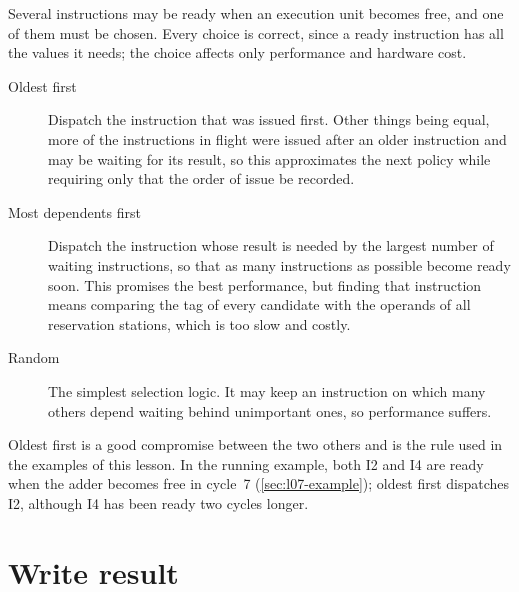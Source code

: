 \documentclass[../main.tex]{subfiles}
\begin{document}
Several instructions may be ready when an execution unit becomes free, and
one of them must be chosen.  Every choice is
correct, since a ready instruction has all the values it needs; the choice
affects only performance and hardware cost.
\begin{description}
  \item[Oldest first] Dispatch the instruction that was
    issued first.  Other things being equal, more of the instructions in
    flight were issued after an older instruction and may be waiting for its
    result, so this approximates the next policy while requiring only that
    the order of issue be recorded.
  \item[Most dependents first] Dispatch the instruction whose result is
    needed by the largest number of waiting instructions, so that as many
    instructions as possible become ready soon.  This promises the best performance, but
    finding that instruction means comparing the tag of every candidate with
    the operands of all reservation stations, which is too slow and costly.
  \item[Random] The simplest selection logic.  It may keep an instruction on
    which many others depend waiting behind unimportant ones, so performance
    suffers.
\end{description}
Oldest first is a good compromise between the two others and is the rule used
in the examples of this lesson.  In the running example, both I2 and I4 are ready when the adder becomes free in cycle~7
(\cref{sec:l07-example}); oldest first dispatches I2, although I4 has been
ready two cycles longer.

\section{Write result}
\label{sec:l07-write}
\end{document}
